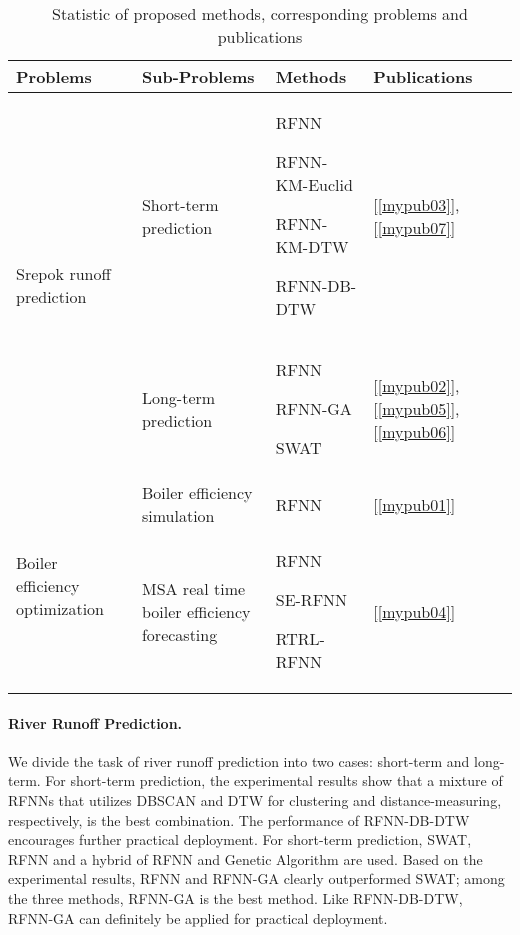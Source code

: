 {\renewcommand{\arraystretch}{1.5}
\begin{table}
  \begin{center}
    \begin{tabular}{| p{3.0 cm} | p{3.0cm} | p{3.5cm} | p{2.5cm} |}
    \hline
    Problems & Sub-Problems & Methods & Publications \\
    \hline
	\multirow{2}{3.0 cm}{Srepok runoff prediction} & Short-term prediction 
	& 	
	RFNN
	
	RFNN-KM-Euclid
	
	RFNN-KM-DTW
	
	RFNN-DB-DTW 	
	& 
	[\ref{mypub03}], [\ref{mypub07}] \\
	\cline{2-4}
	& Long-term prediction & 
	RFNN

	RFNN-GA
	
	SWAT & 
	[\ref{mypub02}], [\ref{mypub05}], [\ref{mypub06}] \\
	\hline
	\multirow{2}{3.0 cm}{Boiler efficiency optimization} & Boiler efficiency simulation 
	& 
	RFNN
	& [\ref{mypub01}] \\
	\cline{2-4}
	& MSA real time boiler efficiency forecasting  
	& 
	RFNN
	
	SE-RFNN
	
	RTRL-RFNN 
	& 
	[\ref{mypub04}] \\
	\hline
	\end{tabular}
    \caption{Statistic of proposed methods, corresponding problems and publications}
     \label{chap7:table01} 
  \end{center} 
\end{table}

\paragraph{River Runoff Prediction.}

We divide the task of river runoff prediction into two cases: short-term and long-term. For short-term prediction, the experimental results show that a mixture of RFNNs that utilizes DBSCAN and DTW for clustering and distance-measuring, respectively, is the best combination. The performance of RFNN-DB-DTW encourages further practical deployment. For short-term prediction, SWAT, RFNN and a hybrid of RFNN and Genetic Algorithm are used. Based on the experimental results, RFNN and RFNN-GA clearly outperformed SWAT; among the three methods, RFNN-GA is the best method. Like RFNN-DB-DTW, RFNN-GA can definitely be applied for practical deployment. 

}
